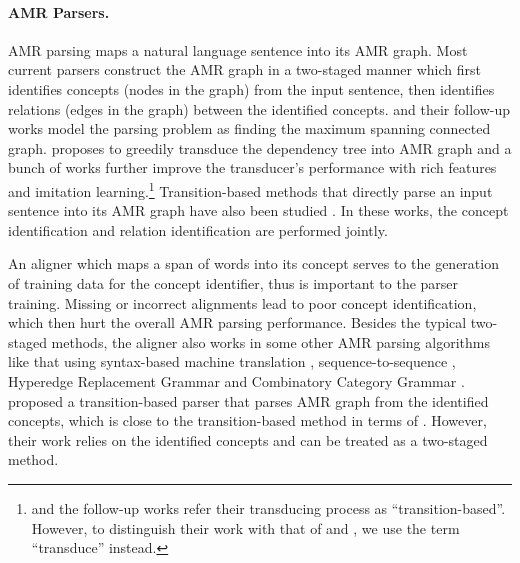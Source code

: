 \documentclass[11pt,a4paper]{article}
\begin{document}
\paragraph{AMR Parsers.}
AMR parsing maps a natural language sentence into
its AMR graph.
Most current parsers construct the AMR graph in a two-staged manner
which first identifies concepts (nodes in the graph) from the
input sentence, then identifies relations (edges in the graph)
between the identified concepts.
\citet{flanigan-EtAl:2014:P14-1} and
their follow-up works \cite{flanigan-EtAl:2016:SemEval,zhou-EtAl:2016:EMNLP20163} model
the parsing problem as finding the maximum spanning connected graph.
\citet{wang-xue-pradhan:2015:NAACL-HLT} proposes to greedily transduce
the dependency tree into AMR graph and a bunch of works
\citep{wang-xue-pradhan:2015:ACL-IJCNLP,goodman-vlachos-naradowsky:2016:P16-1,wang-xue:2017:EMNLP2017}
further improve the transducer's performance with rich features and
imitation learning.\footnote{\citet{wang-xue-pradhan:2015:NAACL-HLT} and the follow-up works refer their transducing process
	as ``transition-based''. However, to distinguish their work with that of \citet{damonte-cohen-satta:2017:EACLlong} and \citet{ballesteros-alonaizan:2017:EMNLP2017},
	we use the term ``transduce'' instead.}
Transition-based methods that directly parse an input sentence
into its AMR graph have also been studied
\cite{ballesteros-alonaizan:2017:EMNLP2017,damonte-cohen-satta:2017:EACLlong}.
In these works, the concept identification and relation identification 
are performed jointly. %

An aligner which maps a span of words into its concept 
serves to the generation of training data for the concept identifier,
thus is important to the parser training.
Missing or incorrect alignments lead to poor concept identification,
which then hurt the overall AMR parsing performance.
Besides the typical two-staged methods,
the aligner also works
in some other AMR parsing algorithms like 
that using syntax-based machine translation \cite{pust-EtAl:2015:EMNLP},
sequence-to-sequence \cite{peng-EtAl:2017:EACLlong1,konstas-EtAl:2017:Long},
Hyperedge Replacement Grammar
\cite{peng-song-gildea:2015:CoNLL} and
Combinatory Category Grammar \cite{artzi-lee-zettlemoyer:2015:EMNLP}.
\citet{P18-1171} proposed a transition-based parser
that parses AMR graph from the identified concepts,
which is close to the transition-based method in terms of .
However, their work relies on the identified concepts
and can be treated as a two-staged method.
\end{document}

